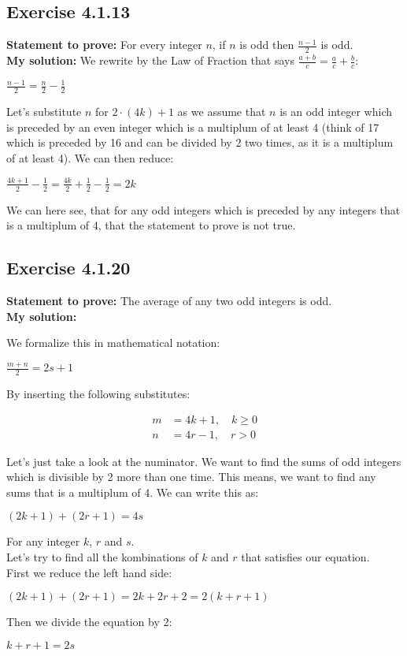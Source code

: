 \documentclass{article}
\newcommand{\cent}[1]{\begin{center}#1\end{center}}
\newcommand{\mAlign}[1]{\begin{align*}#1\end{align*}}
\newcommand{\Prove}{\textbf{Statement to prove: }}
\newcommand{\Solution}{\textbf{My solution: }}
\newcommand{\QED}{\boxed{}}
\newcommand{\Exercise}[1]{\subsection*{Exercise #1}}
\begin{document}
	\Exercise{4.1.13}
	\Prove
	For every integer $n$, if $n$ is odd then $\frac{n-1}{2}$ is odd.\\
	
	\Solution
	We rewrite by the Law of Fraction that says $\frac{a+b}{c} = \frac{a}{c} + \frac{b}{c}$:
	
	\cent{$\frac{n - 1}{2} = \frac{n}{2} - \frac{1}{2}$}
	
	Let's substitute $n$ for $2\cdot (4k) + 1$ as we assume that $n$ is an odd integer which is preceded by an even integer which is a multiplum of at least 4 (think of 17 which is preceded by 16 and can be divided by 2 two times, as it is a multiplum of at least 4). We can then reduce:
	
	\cent{$\frac{4k +1}{2} - \frac{1}{2} = \frac{4k}{2} + \frac{1}{2} - \frac{1}{2} = 2k$}
	
	We can here see, that for any odd integers which is preceded by any integers that is a multiplum of 4, that the statement to prove is not true.\\
	\QED
	
	\Exercise{4.1.20}
	\Prove
	The average of any two odd integers is odd.\\
	
	\Solution
	
	We formalize this in mathematical notation:
	
	\cent{$\frac{m +n }{2} = 2s + 1$}
	
	By inserting the following substitutes:
	
	\mAlign{m &= 4k + 1, \quad  k \geq 0\\
				  n &= 4r -1, \quad r > 0}
	
	Let's just take a look at the numinator. We want to find the sums of odd integers which is divisible by 2 more than one time. This means, we want to find any sums that is a multiplum of 4. We can write this as:
	
	\cent{$(2k+1)+(2r+1)=4s$}
	
	For any integer $k$, $r$ and $s$.\\
	
	Let's try to find all the kombinations of $k$ and $r$ that satisfies our equation.\\
	
	First we reduce the left hand side:
	
	\cent{$(2k+1)+ (2r+1) = 2k + 2r + 2 = 2(k+r + 1 )$}
	
	Then we divide the equation by 2:
	
	\cent{$k+r+1=2s$}
	
\end{document}

